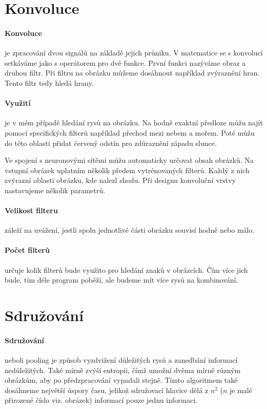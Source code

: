 \documentclass[12pt,a4paper]{report}
\begin{document}
\section{Konvoluce}
\paragraph{Konvoluce}
je zpracování dvou signálů na základě jejich průniku. V matematice se s konvolucí setkáváme jako s operátorem pro dvě funkce. První funkci nazýváme obraz a druhou filtr. Při filtru na obrázku můžeme dosáhnout například zvýraznění hran. Tento filtr tedy hledá hrany.
\paragraph{Využití}
je v mém případě hledání rysů na obrázku. Na hodně exaktní předloze můžu najít pomocí specifických filterů například přechod mezi nebem a mořem. Poté můžu do této oblasti přidat červený odstín pro zdůraznění západu slunce.

Ve spojení s neuronovými sítěmi můžu automaticky určovat obsah obrázků. Na vstupní obrázek uplatním několik předem vytrénovaných filterů. Každý z nich zvýrazní oblasti obrázku, kde nalezl shodu. Při designu konvoluční vrstvy nastavujeme několik parametrů.

\paragraph{Velikost filteru}
záleží na uvážení, jestli spolu jednotlivé části obrázku souvisí hodně nebo málo.
\paragraph{Počet filterů}
určuje kolik filterů bude využito pro hledání znaků v obrázcích. Čím více jich bude, tím déle program poběží, ale budeme mít více rysů na kombinování.
\section{Sdružování}
\paragraph{Sdružování}
neboli pooling je způsob vyzdvižení důležitých rysů a zanedbání informací nedůležitých. Také mírně zvýší entropii, čímž umožní dvěma mírně různým obrázkům, aby po předzpracování vypadali stejně. Tímto algoritmem také dosáhneme největší úspory času, jelikož sdružovací hlavice dělá z $n^2$ ($n$ je malé přirozené číslo viz. obrázek) informací pouze jednu informaci.
\end{document}
